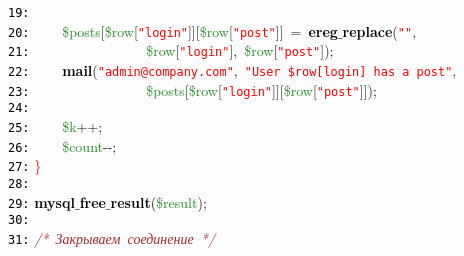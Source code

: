 \documentclass[a4paper,12pt]{article}
\begin{document}
\mbox{}\texttt{\textcolor{Black}{19:}}  \\
\mbox{}\texttt{\textcolor{Black}{20:}} \ \ \ \ \textcolor{ForestGreen}{\$posts}\textcolor{BrickRed}{[}\textcolor{ForestGreen}{\$row}\textcolor{BrickRed}{[}\texttt{\textcolor{Red}{"{}login"{}}}\textcolor{BrickRed}{]][}\textcolor{ForestGreen}{\$row}\textcolor{BrickRed}{[}\texttt{\textcolor{Red}{"{}post"{}}}\textcolor{BrickRed}{]]}\ \textcolor{BrickRed}{=}\ \textbf{\textcolor{Black}{ereg$\_$replace}}\textcolor{BrickRed}{(}\texttt{\textcolor{Red}{"{}"{}}}\textcolor{BrickRed}{,}\  \\
\mbox{}\texttt{\textcolor{Black}{21:}} \ \ \ \ \ \ \ \ \ \ \ \ \ \ \ \ \textcolor{ForestGreen}{\$row}\textcolor{BrickRed}{[}\texttt{\textcolor{Red}{"{}login"{}}}\textcolor{BrickRed}{],}\ \textcolor{ForestGreen}{\$row}\textcolor{BrickRed}{[}\texttt{\textcolor{Red}{"{}post"{}}}\textcolor{BrickRed}{]);} \\
\mbox{}\texttt{\textcolor{Black}{22:}} \ \ \ \ \textbf{\textcolor{Black}{mail}}\textcolor{BrickRed}{(}\texttt{\textcolor{Red}{"{}admin@company.com"{}}}\textcolor{BrickRed}{,}\ \texttt{\textcolor{Red}{"{}User\ \$row[login]\ has\ a\ post"{}}}\textcolor{BrickRed}{,}\  \\
\mbox{}\texttt{\textcolor{Black}{23:}} \ \ \ \ \ \ \ \ \ \ \ \ \ \ \ \ \textcolor{ForestGreen}{\$posts}\textcolor{BrickRed}{[}\textcolor{ForestGreen}{\$row}\textcolor{BrickRed}{[}\texttt{\textcolor{Red}{"{}login"{}}}\textcolor{BrickRed}{]][}\textcolor{ForestGreen}{\$row}\textcolor{BrickRed}{[}\texttt{\textcolor{Red}{"{}post"{}}}\textcolor{BrickRed}{]]);} \\
\mbox{}\texttt{\textcolor{Black}{24:}}  \\
\mbox{}\texttt{\textcolor{Black}{25:}} \ \ \ \ \textcolor{ForestGreen}{\$k}\textcolor{BrickRed}{++;} \\
\mbox{}\texttt{\textcolor{Black}{26:}} \ \ \ \ \textcolor{ForestGreen}{\$count}\textcolor{BrickRed}{-\/-;} \\
\mbox{}\texttt{\textcolor{Black}{27:}} \textcolor{Red}{\}} \\
\mbox{}\texttt{\textcolor{Black}{28:}}  \\
\mbox{}\texttt{\textcolor{Black}{29:}} \textbf{\textcolor{Black}{mysql$\_$free$\_$result}}\textcolor{BrickRed}{(}\textcolor{ForestGreen}{\$result}\textcolor{BrickRed}{);} \\
\mbox{}\texttt{\textcolor{Black}{30:}}  \\
\mbox{}\texttt{\textcolor{Black}{31:}} \textit{\textcolor{Brown}{/*\ Закрываем\ соединение\ */}} \\
\end{document}
